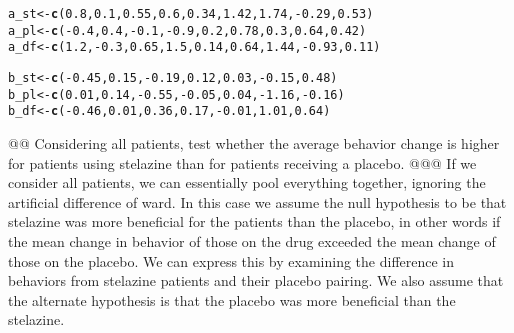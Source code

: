 \documentclass[10pt]{article}\usepackage[]{graphicx}\usepackage[]{xcolor}
\makeatletter
\newcommand{\hlnum}[1]{\textcolor[rgb]{0.686,0.059,0.569}{#1}}%
\newcommand{\hlopt}[1]{\textcolor[rgb]{0,0,0}{#1}}%
\newcommand{\hlstd}[1]{\textcolor[rgb]{0.345,0.345,0.345}{#1}}%
\newcommand{\hlkwb}[1]{\textcolor[rgb]{0.69,0.353,0.396}{#1}}%
\newcommand{\hlkwd}[1]{\textcolor[rgb]{0.737,0.353,0.396}{\textbf{#1}}}%
\newenvironment{kframe}{%
 \def\at@end@of@kframe{}%
 \ifinner\ifhmode%
  \def\at@end@of@kframe{\end{minipage}}%
  \begin{minipage}{\columnwidth}%
 \fi\fi%
 \def\FrameCommand##1{\hskip\@totalleftmargin \hskip-\fboxsep
 \colorbox{shadecolor}{##1}\hskip-\fboxsep
     \hskip-\linewidth \hskip-\@totalleftmargin \hskip\columnwidth}%
 \MakeFramed {\advance\hsize-\width
   \@totalleftmargin\z@ \linewidth\hsize
   \@setminipage}}%
 {\par\unskip\endMakeFramed%
 \at@end@of@kframe}
\newenvironment{knitrout}{}{} %
\makeatother
\begin{document}
\begin{easylist}[enumerate]
\begin{knitrout}
\color{fgcolor}\begin{kframe}
\begin{alltt}
     \hlstd{a_st} \hlkwb{<-} \hlkwd{c}\hlstd{(}\hlnum{0.8}\hlstd{,} \hlnum{0.1}\hlstd{,} \hlnum{0.55}\hlstd{,} \hlnum{0.6}\hlstd{,} \hlnum{0.34}\hlstd{,} \hlnum{1.42}\hlstd{,} \hlnum{1.74}\hlstd{,} \hlopt{-}\hlnum{0.29}\hlstd{,} \hlnum{0.53}\hlstd{)}
     \hlstd{a_pl} \hlkwb{<-} \hlkwd{c}\hlstd{(}\hlopt{-}\hlnum{0.4}\hlstd{,} \hlnum{0.4}\hlstd{,} \hlopt{-}\hlnum{0.1}\hlstd{,} \hlopt{-}\hlnum{0.9}\hlstd{,} \hlnum{0.2}\hlstd{,} \hlnum{0.78}\hlstd{,} \hlnum{0.3}\hlstd{,} \hlnum{0.64}\hlstd{,} \hlnum{0.42}\hlstd{)}
     \hlstd{a_df} \hlkwb{<-} \hlkwd{c}\hlstd{(}\hlnum{1.2}\hlstd{,} \hlopt{-}\hlnum{0.3}\hlstd{,} \hlnum{0.65}\hlstd{,} \hlnum{1.5}\hlstd{,} \hlnum{0.14}\hlstd{,} \hlnum{0.64}\hlstd{,} \hlnum{1.44}\hlstd{,} \hlopt{-}\hlnum{0.93}\hlstd{,} \hlnum{0.11}\hlstd{)}

     \hlstd{b_st} \hlkwb{<-} \hlkwd{c}\hlstd{(}\hlopt{-}\hlnum{0.45}\hlstd{,} \hlnum{0.15}\hlstd{,} \hlopt{-}\hlnum{0.19}\hlstd{,} \hlnum{0.12}\hlstd{,} \hlnum{0.03}\hlstd{,} \hlopt{-}\hlnum{0.15}\hlstd{,} \hlnum{0.48}\hlstd{)}
     \hlstd{b_pl} \hlkwb{<-} \hlkwd{c}\hlstd{(}\hlnum{0.01}\hlstd{,} \hlnum{0.14}\hlstd{,} \hlopt{-}\hlnum{0.55}\hlstd{,} \hlopt{-}\hlnum{0.05}\hlstd{,} \hlnum{0.04}\hlstd{,} \hlopt{-}\hlnum{1.16}\hlstd{,} \hlopt{-}\hlnum{0.16}\hlstd{)}
     \hlstd{b_df} \hlkwb{<-} \hlkwd{c}\hlstd{(}\hlopt{-}\hlnum{0.46}\hlstd{,} \hlnum{0.01}\hlstd{,} \hlnum{0.36}\hlstd{,} \hlnum{0.17}\hlstd{,} \hlopt{-}\hlnum{0.01}\hlstd{,} \hlnum{1.01}\hlstd{,} \hlnum{0.64}\hlstd{)}
\end{alltt}
\end{kframe}
\end{knitrout}



    @@ Considering all patients, test whether the average behavior change is higher for patients using stelazine than
    for patients receiving a placebo.
    @@@ If we consider all patients, we can essentially pool everything together, ignoring the artificial difference of
    ward. In this case we assume the null hypothesis to be that stelazine was more beneficial for the patients than the
    placebo, in other words if the mean change in behavior of those on the drug exceeded the mean change of those on the
    placebo. We can express this by examining the difference in behaviors from stelazine patients and their placebo
    pairing. We also assume that the alternate hypothesis is that the placebo was more beneficial than the stelazine.


\end{easylist}
\end{document}
